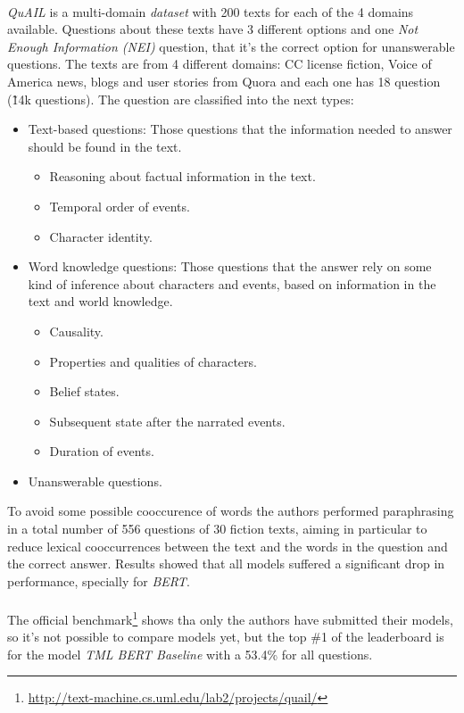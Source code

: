 \paragraph{}
\emph{QuAIL} is a multi-domain \emph{dataset} with 200 texts for each of the 4 domains available. Questions about these texts have 3 different options and one \emph{Not Enough Information (NEI)} question, that it's the correct option for unanswerable questions. The texts are from 4 different domains: CC license fiction, Voice of America news, blogs and user stories from Quora and each one has 18 question (\~14k questions). The question are classified into the next types:
\begin{itemize}
	\item Text-based questions: Those questions that the information needed to answer should be found in the text.
	\begin{itemize}
		\item Reasoning about factual information in the text.
		\item Temporal order of events.
		\item Character identity.
	\end{itemize}
	\item Word knowledge questions: Those questions that the answer rely on some kind of inference about characters and events, based on information in the text and world knowledge.
	\begin{itemize}
		\item Causality.
		\item Properties and qualities of characters.
		\item Belief states.
		\item Subsequent state after the narrated events.
		\item Duration of events.
	\end{itemize}
	\item Unanswerable questions. 
\end{itemize}
To avoid some possible cooccurence of words the authors performed paraphrasing in a total number of 556 questions of 30 fiction texts, aiming in particular to reduce lexical cooccurrences between the text and the words in the question and the correct answer. Results showed that all models suffered a significant drop in performance, specially for \emph{BERT}.
\paragraph{}
The official benchmark\footnote{\url{http://text-machine.cs.uml.edu/lab2/projects/quail/}} shows tha only the authors have submitted their models, so it's not possible to compare models yet, but the top \#1 of the leaderboard is for the model \emph{TML BERT Baseline} with a 53.4\% for all questions.
